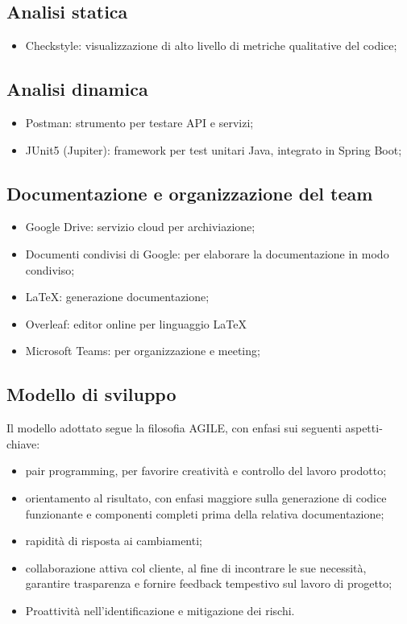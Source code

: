 \subsection{Analisi statica}
\begin{itemize}
	\item Checkstyle: visualizzazione di alto livello di metriche qualitative del codice;
\end{itemize}

\subsection{Analisi dinamica}
\begin{itemize}
	\item Postman: strumento per testare API e servizi;
	\item JUnit5 (Jupiter): framework per test unitari Java, integrato in Spring Boot;
\end{itemize}

\subsection{Documentazione e organizzazione del team}
\begin{itemize}
	\item Google Drive: servizio cloud per archiviazione;
	\item Documenti condivisi di Google: per elaborare la documentazione in modo condiviso;
	\item \LaTeX: generazione documentazione;
    \item Overleaf: editor online per linguaggio \LaTeX
	\item Microsoft Teams: per organizzazione e meeting;
\end{itemize}

\subsection{Modello di sviluppo}
Il modello adottato segue la filosofia AGILE, con enfasi sui seguenti aspetti-chiave:
\begin{itemize}
	\item pair programming, per favorire creatività e controllo del lavoro prodotto;
	\item orientamento al risultato, con enfasi maggiore sulla generazione di codice funzionante e componenti completi prima della relativa documentazione;
	\item rapidità di risposta ai cambiamenti;
	\item collaborazione attiva col cliente, al fine di incontrare le sue necessità, garantire trasparenza e fornire feedback tempestivo sul lavoro di progetto;
	\item Proattività nell’identificazione e mitigazione dei rischi.
\end{itemize}

\clearpage
